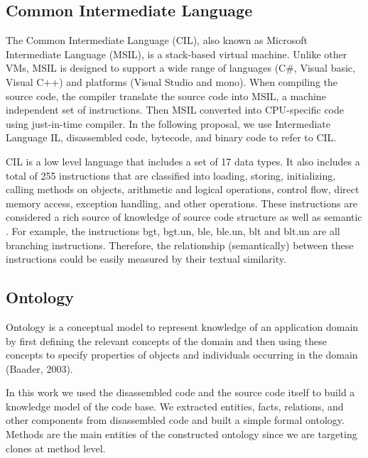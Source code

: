 



\subsection{Common Intermediate Language}

\label {secCIL}

The Common Intermediate Language (CIL), also known as Microsoft Intermediate Language (MSIL), is a stack-based virtual machine. Unlike other VMs, MSIL is designed to support a wide range of languages (C\#, Visual basic, Visual C++) and platforms (Visual Studio and mono). When compiling the source code, the compiler translate the source code into MSIL, a machine independent set of instructions. Then MSIL converted into CPU-specific code using just-in-time compiler. In the following proposal, we use Intermediate Language IL, disassembled code, bytecode, and binary code to refer to CIL.



CIL is a low level language that includes a set of 17 data types. It also includes a total of 255 instructions that are classified into loading, storing, initializing, calling methods on objects, arithmetic and logical operations, control flow, direct memory access, exception handling, and other operations. These instructions are considered a rich source of knowledge of source code structure  as well as semantic . For example, the instructions bgt, bgt.un, ble, ble.un, blt and blt.un are all branching instructions. Therefore, the relationship (semantically) between these instructions could be easily measured by their textual similarity.  



\subsection{Ontology}


Ontology is a conceptual model to represent knowledge of an application domain by first defining the relevant concepts of the domain and then using these concepts to specify properties of objects and individuals occurring in the domain (Baader, 2003). %

In this work we used the disassembled code  and the source code itself to build a knowledge model of the code base. We extracted entities, facts, relations, and other components from disassembled code and built a simple formal ontology. Methods are the main entities of the constructed ontology since we are targeting clones at method level.



